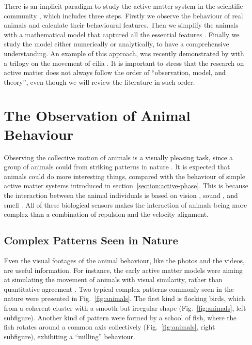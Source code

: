 \documentclass[11pt,twoside]{report}
\begin{document}
There is an implicit paradigm to study the active matter system in the scientific community \cite{allen2017}, which includes three steps. Firstly we observe the behaviour of real animals and calculate their behavioural features. Then we simplify the animals with a mathematical model that captured all the essential features \cite{sumpter2012}. Finally we study the model either numerically or analytically, to have a comprehensive understanding. An example of this approach, was recently demonstrated by \citeauthor{bull2021ep3} with a trilogy
on the movement of cilia \cite{bull2021ep1, bull2021ep2, bull2021ep3}. It is important to stress that the research on active matter does not always follow the order of ``observation, model, and theory'', even though we will review the literature in such order.


\section{The Observation of Animal Behaviour}
\label{section:intro-observe}

Observing the collective motion of animals is a visually pleasing task, since a group of animals could from striking patterns in nature \cite{vicsek2012}. 
It is expected that animals could do more interesting things, compared with the behaviour of simple active matter systems introduced in section~\ref{section:active-phase}. This is because the interaction between the animal individuals is based on vision \cite{strandburg-peshkin2013}, sound \cite{ota2020}, and smell \cite{miller2022}. All of these biological sensors makes the interaction of animals being more complex than a combination of repulsion and the velocity alignment.

\subsection {Complex Patterns Seen in Nature}

Even the visual footages of the animal behaviour, like the photos and the videos, are useful information.
For instance, the early active matter models were aiming at simulating the movement of animals with visual similarity, rather than quantitative agreement \cite{reynolds1987, vicsek1995, couzin2002}.
Two typical complex patterns commonly seen in the nature were presented in Fig.~\ref{fig:animals}. The first kind is flocking birds, which from a coherent cluster with a smooth but irregular shape (Fig.~\ref{fig:animals}, left subfigure). Another kind of pattern were formed by a school of fish, where the fish rotates around a common axis collectively (Fig.~\ref{fig:animals}, right subfigure), exhibiting a ``milling'' behaviour.
\end{document}
